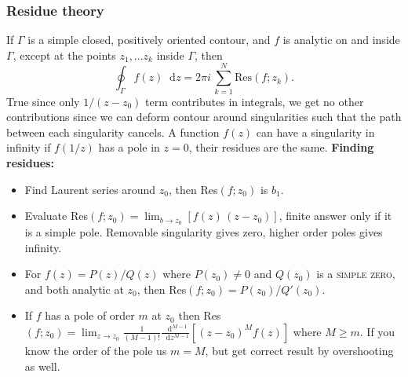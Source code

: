 \documentclass[a4paper, 10pt]{article}
\newcommand*\diff{\mathop{}\!\mathrm{d}}
\begin{document}
\begin{multicols*}{3}
\subsubsection*{Residue theory}
If $\Gamma$ is a simple closed, positively oriented contour, and $f$ is analytic on and inside $\Gamma$, except at the points $z_1,...z_k$ inside $\Gamma$, then
\begin{equation}
  \oint_{\Gamma} f(z) \diff z = 2\pi i\, \sum_{k=1}^{N} \text{Res}(f;z_k).
\end{equation}
True since only $1/(z-z_0)$ term contributes in integrals, we get no other contributions since we can deform contour around singularities such that the path between each singularity cancels. A function $f(z)$ can have a singularity in infinity if $f(1/z)$ has a pole in $z=0$, their residues are the same.
\textbf{Finding residues:}
\begin{itemize}
  \item Find Laurent series around $z_0$, then Res$(f;z_0)$ is $b_1$.
  \item Evaluate Res$(f;z_0)=\lim_{b\rightarrow z_0} \left[f(z)\,(z-z_0)\right]$, finite answer only if it is a simple pole. Removable singularity gives zero, higher order poles gives infinity.
  \item For $f(z)=P(z)/Q(z)$ where $P(z_0)\neq 0$ and $Q(z_0)$ is a \textsc{simple zero}, and both analytic at $z_0$, then Res$(f;z_0)=P(z_0)/Q'(z_0)$.
  \item If $f$ has a pole of order $m$ at $z_0$ then Res$(f;z_0) = \lim_{z\rightarrow z_0} \frac{1}{(M-1)!}\frac{\diff^{M-1}}{\diff z^{M-1}}\left[(z-z_0)^Mf(z)\right]$ where $M \geq m$. If you know the order of the pole us $m=M$, but get correct result by overshooting as well.
\end{itemize}

\end{multicols*}
\end{document}
